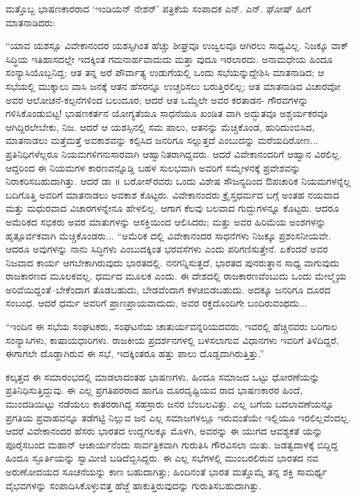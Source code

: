ಮತ್ತೊಬ್ಬ ಭಾಷಣಕಾರರಾದ ‘ಇಂಡಿಯನ್ ನೇಶನ್​’ ಪತ್ರಿಕೆಯ ಸಂಪಾದಕ ಎನ್. ಎನ್. ಘೋಷ್ ಹೀಗೆ ಮಾತನಾಡಿದರು:

“ಯಾವ ಯಶಸ್ಸೂ ವಿವೇಕಾನಂದರ ಯಶಸ್ಸಿಗಿಂತ ಹೆಚ್ಚು ಶೀಘ್ರವೂ ಉಜ್ವಲವೂ ಆಗಿರಲು ಸಾಧ್ಯವಿಲ್ಲ. ನಿಜಕ್ಕೂ ವಾಕ್​ಸಿದ್ಧಿಯ ಇತಿಹಾಸದಲ್ಲೇ ಇದಕ್ಕಿಂತ ಗಮನಾರ್ಹವಾದುದು ಮತ್ತಾ ವುದೂ ಇರಲಾರದು. ಅನಾಮಧೇಯ ಹಿಂದೂ ಸಂನ್ಯಾಸಿಯೊಬ್ಬನಿದ್ದ; ಆತ ತನ್ನ ಅರೆ ಪೌರ್ವಾತ್ಯ ಉಡುಗೆಯಲ್ಲಿ ಒಂದು ಸಭೆಯನ್ನುದ್ದೇಶಿಸಿ ಮಾತನಾಡಿದ; ಆ ಸಭೆಯಲ್ಲಿ ಮುಕ್ಕಾಲು ವಾಸಿ ಜನಕ್ಕೆ ಆತನ ಹೆಸರನ್ನೂ ಉಚ್ಚರಿಸಲು ಬರುತ್ತಿರಲಿಲ್ಲ; ಆತ ಮಾತನಾಡಿದ ವಿಚಾರವೋ ಅವರ ಆಲೋಚನೆ-ಕಲ್ಪನೆಗಳಿಂದ ಬಲುದೂರ; ಆದರೆ ಆತ ಒಮ್ಮೆಲೇ ಅವರ ಕರತಾಡನ- ಗೌರವಗಳನ್ನು ಗಳಿಸಿಕೊಂಡುಬಿಟ್ಟ! ಭಾಷಣಕರ್ತನ ಯೋಗ್ಯತೆಯೂ ಸಾಧನೆಯೂ ಖಂಡಿತ ವಾಗಿ ಅದ್ಭುತವೂ ಅಶ್ಚರ್ಯಕರವೂ ಆಗಿದ್ದಿರಲೇಬೇಕು, ನಿಜ. ಆದರೆ ಆ ಯಶಸ್ಸಿನಲ್ಲಿ ಸಮ ಪಾಲು, ಆತನನ್ನು ಮೆಚ್ಚಿಕೊಂಡ, ಹುರಿದುಂಬಿಸಿದ, ಮಾತನಾಡಲು ಮತ್ತೆಮತ್ತೆ ಅವಕಾಶವನ್ನು ಕಲ್ಪಿಸಿದ ಜನರಿಗೂ ಸಲ್ಲುತ್ತದೆ ಎಂಬುದನ್ನು ಮರೆಯದಿರೋಣ... ಪ್ರತಿನಿಧಿಗಳೆಲ್ಲರೂ ನಿಯಮಗಳಿಗನುಸಾರವಾಗಿ ಆಹ್ವಾನಿತರಾಗಿದ್ದವರು. ಆದರೆ ವಿವೇಕಾನಂದರಿಗೆ ಆಹ್ವಾನ ವಿರಲಿಲ್ಲ. ಆದ್ದರಿಂದ ಈ ನಿಯಮಗಳ ಕಾರಣವನ್ನೊಡ್ಡಿ ಬಹಳ ಸುಲಭವಾಗಿ ಅವರಿಗೆ ಸಮ್ಮೇಳನಕ್ಕೆ ಪ್ರವೇಶವನ್ನು ನಿರಾಕರಿಸಬಹುದಾಗಿತ್ತು. ಆದರೆ ಡಾ ॥ ಬರೋಸ್​ರವರು ಒಂದು ವಿಶೇಷ ಸೌಜನ್ಯದಿಂದ ಔಪಚಾರಿಕ ನಿಯಮಗಳನ್ನೆಲ್ಲ ಬದಿಗೊತ್ತಿ ಅವರಿಗೆ ಮಾತನಾಡಲು ಅವಕಾಶ ಕೊಟ್ಟರು. ವಿವೇಕಾನಂದರು ಕ್ರೈಸ್ತಧರ್ಮದ ಬಗ್ಗೆ ಅಂತಹ ನಯವಾದ ಮತ್ತು ಮಧುರವಾದ ವಿಚಾರಗಳನ್ನೇನೂ ಹೇಳಲಿಲ್ಲ. ಆಗಾಗ ಕೆಲವು ಬಲವಾದ ಗುದ್ದುಗಳನ್ನೂ ಕೊಟ್ಟರು. ಆದರೂ ಅಮೆರಿಕದ ಸಭಿಕರು ಅವರ ಮಾತುಗಳನ್ನು ಆಸಕ್ತಿಯಿಂದ ಆಲಿಸಿದರು; ಮತ್ತು ಅವರ ಹಿರಿಮೆಯ ಅಂಶಗಳನ್ನು ಹೃತ್ಪೂರ್ವಕವಾಗಿ ಮೆಚ್ಚಿಕೊಂಡರು... “ಅಮೆರಿಕ ದಲ್ಲಿ ವಿವೇಕಾನಂದರ ಸಾಧನೆಗಳು ನಿಜಕ್ಕೂ ಪ್ರಶಂಸನೀಯವೇ. ಆದರೂ ಅವುಗಳನ್ನು ನಾನು ಸಿದ್ಧಿಗಳು ಎಂಬುದಕ್ಕಿಂತ ಭರವಸೆಗಳು ಎಂದು ಪರಿಗಣಿಸುತ್ತೇನೆ. ಏಕೆಂದರೆ ಅವರ ನಿಜವಾದ ಕಾರ್ಯ ಆಗಬೇಕಾಗಿರುವುದು ಭಾರತದಲ್ಲಿ. ನನಗನ್ನಿಸುತ್ತದೆ, ಭಾರತದ ಪುನರುತ್ಥಾನ ಸಾಧ್ಯ ವಾಗುವುದು ರಾಜಕಾರಣದ ಮೂಲಕವಲ್ಲ, ಧರ್ಮದ ಮೂಲಕ ಎಂದು. ಈ ದೇಶದಲ್ಲಿ ರಾಜಕಾರಣವೆಂಬುದು ಒಂದು ಮೇಲ್ಮೈಯ ಅರಿವೆಯಿದ್ದಂತೆ–ಬೇಕೆಂದಾಗ ತೊಡಬಹುದು, ಬೇಡವೆಂದಾಗ ಕಳಚಿಬಿಡಬಹುದು. ಅದಕ್ಕೂ ಜನರಿಗೂ ದೂರದ ಸಂಬಂಧ. ಆದರೆ ಧರ್ಮ ಅವರಿಗೆ ಪ್ರಾಣಪ್ರಾಯವಾದುದು, ಅವರ ರಕ್ತದೊಂದಿಗೇ ಬಂದಿರುವಂಥದು...

“ಇಂದಿನ ಈ ಸಭೆಯ ಸಂಘಟಕರು, ಸಂಘಟನೆಯ ಚಾತುರ್ಯವನ್ನರಿಯದವರು. ಇವರಲ್ಲಿ ಹೆಚ್ಚಿನವರು ಬರಿಗಾಲ ಸಂನ್ಯಾಸಿಗಳು, ಕಾಷಾಯಧಾರಿಗಳು. ರಾಜಕೀಯ ಪ್ರದರ್ಶನಗಳಲ್ಲಿ ಬಳಸಲಾಗುವ ವಿಧಾನಗಳು ಇವರಿಗೆ ತಿಳಿದಿದ್ದರೆ, ಈಗಾಗಲೇ ದೊಡ್ಡಾಗಿರುವ ಈ ಸಭೆ, ಇದಕ್ಕಿಂತರೂ ಹತ್ತು ಪಾಲು ದೊಡ್ಡದಾಗಿರುತ್ತಿತ್ತು.”

ಕಲ್ಕತ್ತದ ಈ ಸಮಾರಂಭದಲ್ಲಿ ಮಾಡಲಾದಂತಹ ಭಾಷಣಗಳು, ಹಿಂದೂ ಸಮಾಜದ ಒಟ್ಟು ಧೋರಣೆಯನ್ನು ಪ್ರತಿನಿಧಿಸುತ್ತಿದ್ದುವು. ಈ ಎಲ್ಲ ಪ್ರಗತಿಪರರಾದ ಹಾಗೂ ದೂರದೃಷ್ಟಿಯವ ರಾದ ಭಾಷಣಕಾರರ ಹಿಂದೆ, ಮುಂದಡಿಯಿಟ್ಟು ನಡೆಯಲು ಕಾತರರಾಗಿದ್ದ ಸಹಸ್ರಾರು ಜನರ ಬೆಂಬಲವಿತ್ತು. ಎಲ್ಲ ಬಗೆಯ ಬದಲಾವಣೆಯನ್ನೂ ಪ್ರಗತಿಯ ಪ್ರವಾಹವನ್ನೂ ತಡೆಗಟ್ಟಿ ನಿಲ್ಲುವ ಜನ ಎಲ್ಲ ಸಮಾಜಗಳಲ್ಲೂ ಇರುವಂತೆಯೇ ಇಲ್ಲಿಯೂ ಇರಲಿಲ್ಲವೆಂದಲ್ಲ. ಆದರೆ ವಿವೇಕಾನಂದರ ಹೆಸರು ಭಾರತದ ಉದ್ದಗಲಕ್ಕೂ ಮೊಳಗಿ, ಅವರನ್ನು ಈ ಯುಗದ ಆವಶ್ಯಕತೆ ಯನ್ನು ಪೂರೈಸಬಂದ ಮಹಾನ್ ಆಚಾರ್ಯನೆಂದು ಸಾರ್ವತ್ರಿಕವಾಗಿ ಗುರುತಿಸಿ ಗೌರವಿಸಲಾ ಯಿತು. ಜಡತ್ವದಾಳಕ್ಕೆ ಬಿದ್ದಿದ್ದ ಹಿಂದೂ ಸ್ಫೂರ್ತಿಯನ್ನು ಸ್ವಾಮೀಜಿ ಬಡಿದೆಬ್ಬಿಸಿದ್ದರು. ಈ ಎಲ್ಲ ಸಭೆಗಳಲ್ಲಿ ಮುಂಬರಲಿರುವ ಭಾರತದ ನವ ಅರುಣೋದಯದ ಸೂಚನೆಯನ್ನು ಕಾಣ ಬಹುದಾಗಿತ್ತು; ಹಿಂದಿನಂತೆ ಭಾರತ ಮತ್ತೊಮ್ಮೆ ತನ್ನ ಶಕ್ತಿ ಸಾಮರ್ಥ್ಯ ವೈಭವಗಳನ್ನು ಸಂಪಾದಿಸಿಕೊಳ್ಳುವತ್ತ ಹೆಜ್ಜೆ ಹಾಕುತ್ತಿರುವುದನ್ನು ಗುರುತಿಸಬಹುದಾಗಿತ್ತು.


